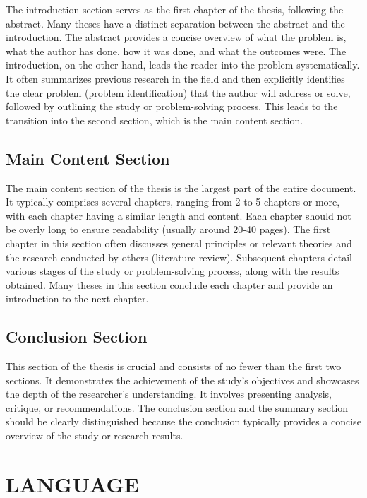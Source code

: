 The introduction section serves as the first chapter of the thesis, following the
abstract. Many theses have a distinct separation between the abstract and the
introduction. The abstract provides a concise overview of what the problem is, what
the author has done, how it was done, and what the outcomes were. The introduction,
on the other hand, leads the reader into the problem systematically. It often
summarizes previous research in the field and then explicitly identifies the clear
problem (problem identification) that the author will address or solve, followed by
outlining the study or problem-solving process. This leads to the transition into the
second section, which is the main content section.

\subsection{Main Content Section}

The main content section of the thesis is the largest part of the entire
document. It typically comprises several chapters, ranging from 2 to 5 chapters or
more, with each chapter having a similar length and content. Each chapter should not
be overly long to ensure readability (usually around 20-40 pages). The first chapter in
this section often discusses general principles or relevant theories and the research
conducted by others (literature review). Subsequent chapters detail various stages of
the study or problem-solving process, along with the results obtained. Many theses in
this section conclude each chapter and provide an introduction to the next chapter.

\subsection{Conclusion Section}

This section of the thesis is crucial and consists of no fewer than the first two
sections. It demonstrates the achievement of the study's objectives and showcases
the depth of the researcher's understanding. It involves presenting analysis, critique, or
recommendations. The conclusion section and the summary section should be clearly
distinguished because the conclusion typically provides a concise overview of the
study or research results.

\section{LANGUAGE}

